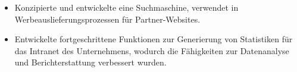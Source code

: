 \begin{itemize}
\item Konzipierte und entwickelte eine Suchmaschine, verwendet in Werbeauslieferungsprozessen für Partner-Websites.
\item Entwickelte fortgeschrittene Funktionen zur Generierung von Statistiken für das Intranet des Unternehmens, wodurch die Fähigkeiten zur Datenanalyse und Berichterstattung verbessert wurden.
\end{itemize}
\divider

